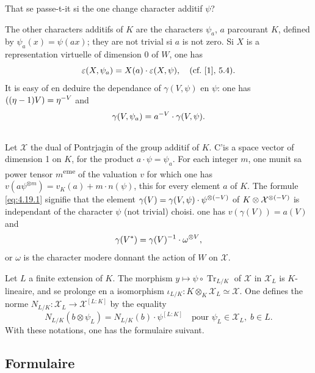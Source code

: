 \documentclass[12pt,a4paper]{article}
\theoremstyle{plain}
\theoremstyle{definition}
\theoremstyle{remark}
\DeclareMathOperator{\Tr}{Tr}
\newcommand{\cX}{\mathcal{X}}
\let\dim\relax\let\det\relax
\providecommand{\cX}{\mathcal{X}}
\providecommand{\Tr}{\operatorname{Tr}}
\begin{document}
That se passe-t-it si the one change character additif $\psi$?

The other characters additifs of $K$ are the characters $\psi_a$, $a$ parcourant $K$, defined by $\psi_a(x) = \psi(ax)$; they are not trivial si $a$ is not zero. Si $X$ is a representation virtuelle of dimension 0 of $W$, one has
\[
\varepsilon(X, \psi_a) = \det X(a) \cdot \varepsilon(X, \psi), \quad \text{(cf.~[1], 5.4)}.
\]
It is easy of en deduire the dependance of $\gamma(V, \psi)$ en $\psi$: one has $\det((\eta-1)V) = \eta^{-\dim V}$ and
\begin{equation}\label{eq:4.19.2}
\gamma(V, \psi_a) = a^{-\dim V} \cdot \gamma(V, \psi).
\end{equation}

\subsection{}
\label{sec:4.20}

Let $\cX$ the dual of Pontrjagin of the group additif of $K$. C'is a space vector of dimension 1 on $K$, for the product $a \cdot \psi = \psi_a$. For each integer $m$, one munit sa power tensor $m$\textsuperscript{eme} of the valuation $v$ for which one has $v(a \psi^{\otimes m}) = v_K(a) + m \cdot n(\psi)$, this for every element $a$ of $K$. The formule \eqref{eq:4.19.1} signifie that the element $\gamma(V) = \gamma(V, \psi) \cdot \psi^{\otimes (-\dim V)}$ of $K \otimes \cX^{\otimes (-\dim V)}$ is independant of the character $\psi$ (not trivial) choisi. one has $v(\gamma(V)) = a(V)$ and
\begin{equation}\label{eq:4.20}
\gamma(V^*) = \gamma(V)^{-1} \cdot \omega^{\otimes \dim V},
\end{equation}
or $\omega$ is the character modere donnant the action of $W$ on $\cX$.

Let $L$ a finite extension of $K$. The morphism $y \mapsto \psi \circ \Tr_{L/K}$ of $\cX$ in $\cX_L$ is $K$-lineaire, and se prolonge en a isomorphism $\iota_{L/K}: K \otimes_K \cX_L \simeq \cX$. One defines the norme $N_{L/K}: \cX_L \to \cX^{[L:K]}$ by the equality
\[
N_{L/K}(b \otimes \psi_L) = N_{L/K}(b) \cdot \psi^{[L:K]} \quad \text{pour } \psi_L \in \cX_L, \; b \in L.
\]
With these notations, one has the formulaire suivant.

\subsection{Formulaire}\label{sec:4.21}
\end{document}
